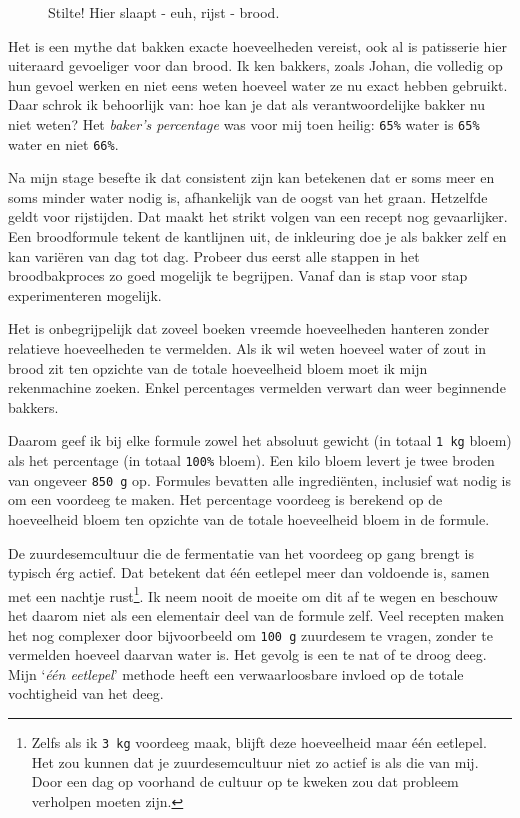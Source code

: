 \documentclass[
  11pt,
  dutch,
]{memoir}
\newcommand{\adjustimg}{%
  \checkoddpage%
  \ifoddpage\hspace*{\dimexpr\evensidemargin-\oddsidemargin}\else\hspace*{-\dimexpr\evensidemargin-\oddsidemargin}\fi%
}
\newcommand{\centerimg}[2][width=\textwidth]{%
  \makebox[\textwidth]{\adjustimg\texttt{[image: \#2]}}%
}
\begin{document}
\begin{figure}
    \mbox{} \par
    \noindent\centerimg[width=\paperwidth]{img/bw/deeg.jpg}
    \caption[Gerezen brooddeeg op een linnen doek.]{Stilte! Hier slaapt - euh, rijst - brood.}
\end{figure}

Het is een mythe dat bakken exacte hoeveelheden vereist, ook al is
patisserie hier uiteraard gevoeliger voor dan brood. Ik ken bakkers,
zoals Johan, die volledig op hun gevoel werken en niet eens weten
hoeveel water ze nu exact hebben gebruikt. Daar schrok ik behoorlijk
van: hoe kan je dat als verantwoordelijke bakker nu niet weten? Het
\emph{baker's percentage} was voor mij toen heilig: \texttt{65\%} water
is \texttt{65\%} water en niet \texttt{66\%}.

Na mijn stage besefte ik dat consistent zijn kan betekenen dat er soms
meer en soms minder water nodig is, afhankelijk van de oogst van het
graan. Hetzelfde geldt voor rijstijden. Dat maakt het strikt volgen van
een recept nog gevaarlijker. Een broodformule tekent de kantlijnen uit,
de inkleuring doe je als bakker zelf en kan variëren van dag tot dag.
Probeer dus eerst alle stappen in het broodbakproces zo goed mogelijk te
begrijpen. Vanaf dan is stap voor stap experimenteren mogelijk.

Het is onbegrijpelijk dat zoveel boeken vreemde hoeveelheden hanteren
zonder relatieve hoeveelheden te vermelden. Als ik wil weten hoeveel
water of zout in brood zit ten opzichte van de totale hoeveelheid bloem
moet ik mijn rekenmachine zoeken. Enkel percentages vermelden verwart
dan weer beginnende bakkers.

Daarom geef ik bij elke formule zowel het absoluut gewicht (in totaal
\texttt{1\ kg} bloem) als het percentage (in totaal \texttt{100\%}
bloem). Een kilo bloem levert je twee broden van ongeveer
\texttt{850\ g} op. Formules bevatten alle ingrediënten, inclusief wat
nodig is om een voordeeg te maken. Het percentage voordeeg is berekend
op de hoeveelheid bloem ten opzichte van de totale hoeveelheid bloem in
de formule.

De zuurdesemcultuur die de fermentatie van het voordeeg op gang brengt
is typisch érg actief. Dat betekent dat één eetlepel meer dan voldoende
is, samen met een nachtje rust\footnote{Zelfs als ik \texttt{3\ kg}
  voordeeg maak, blijft deze hoeveelheid maar één eetlepel. Het zou
  kunnen dat je zuurdesemcultuur niet zo actief is als die van mij. Door
  een dag op voorhand de cultuur op te kweken zou dat probleem verholpen
  moeten zijn.}. Ik neem nooit de moeite om dit af te wegen en beschouw
het daarom niet als een elementair deel van de formule zelf. Veel
recepten maken het nog complexer door bijvoorbeeld om \texttt{100\ g}
zuurdesem te vragen, zonder te vermelden hoeveel daarvan water is. Het
gevolg is een te nat of te droog deeg. Mijn `\emph{één eetlepel}'
methode heeft een verwaarloosbare invloed op de totale vochtigheid van
het deeg.
\end{document}
